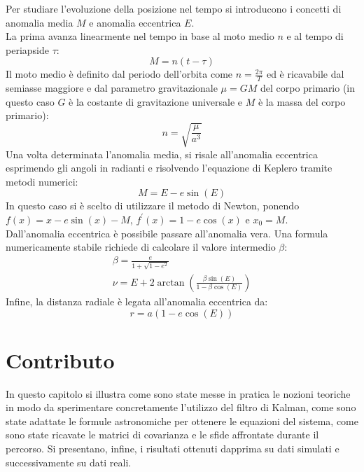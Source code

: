 \documentclass[12pt,a4paper,openright,twoside]{book}
\begin{document}
Per studiare l'evoluzione della posizione nel tempo si introducono i concetti di anomalia media $M$ e anomalia eccentrica $E$. \\
La prima avanza linearmente nel tempo in base al moto medio $n$ e al tempo di periapside $\tau$:
\begin{equation}\label{eq:advance-mean-anomaly}
M=n(t-\tau)
\end{equation}
Il moto medio è definito dal periodo dell'orbita come $n=\frac{2\pi}{T}$ ed è ricavabile dal semiasse maggiore e dal parametro gravitazionale $\mu=GM$ del corpo primario (in questo caso $G$ è la costante di gravitazione universale e $M$ è la massa del corpo primario):
\begin{equation}
n=\sqrt{\frac{\mu}{a^3}}
\end{equation}
Una volta determinata l'anomalia media, si risale all'anomalia eccentrica esprimendo gli angoli in radianti e risolvendo l'equazione di Keplero tramite metodi numerici:
\begin{equation}\label{eq:mean2ecc}
M=E-e\sin(E)
\end{equation}
In questo caso si è scelto di utilizzare il metodo di Newton, ponendo $f(x)=x-e\sin(x)-M$, $f^\prime(x)=1-e\cos(x)$ e $x_0=M$. \\
Dall'anomalia eccentrica è possibile passare all'anomalia vera. Una formula numericamente stabile richiede di calcolare il valore intermedio $\beta$:
\begin{gather}
\beta=\frac{e}{1+\sqrt{1-e^2}} \\
\nu=E+2\arctan\left(\frac{\beta\sin(E)}{1-\beta\cos(E)}\right)\label{eq:ecc2true}
\end{gather}
Infine, la distanza radiale è legata all'anomalia eccentrica da:
\begin{equation}\label{eq:ecc2dist}
r=a(1-e\cos(E))
\end{equation}

\chapter{Contributo}

In questo capitolo si illustra come sono state messe in pratica le nozioni teoriche in modo da sperimentare concretamente l'utilizzo del filtro di Kalman, come sono state adattate le formule astronomiche per ottenere le equazioni del sistema, come sono state ricavate le matrici di covarianza e le sfide affrontate durante il percorso. Si presentano, infine, i risultati ottenuti dapprima su dati simulati e successivamente su dati reali.
\end{document}
